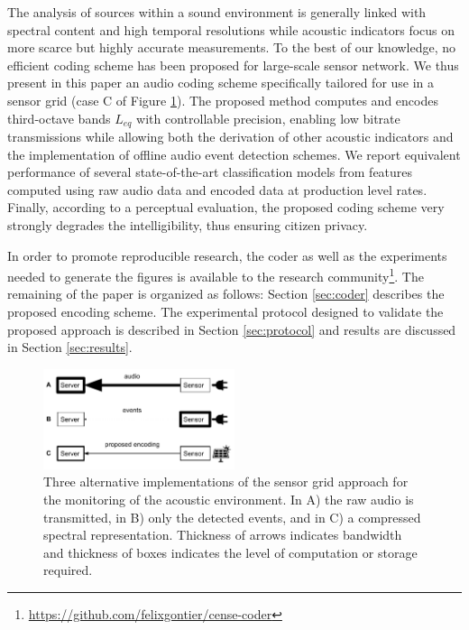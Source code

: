 \documentclass[sensors,article,submit,moreauthors,pdftex,10pt,a4paper]{mdpi}
\begin{document}
The analysis of sources within a sound environment is generally linked with spectral content \cite{ishiyama2000} and high temporal resolutions while acoustic indicators focus on more scarce but highly accurate measurements. To the best of our knowledge, no efficient coding scheme has been proposed for large-scale sensor network. We thus present in this paper an audio coding scheme specifically tailored for use in a sensor grid (case C of Figure \ref{fig:codingScheme}). The proposed method computes and encodes third-octave bands $L_{eq}$ with controllable precision, enabling low bitrate transmissions while allowing both the derivation of other acoustic indicators and the implementation of offline audio event detection schemes. We report equivalent performance of several state-of-the-art classification models from features computed using raw audio data and encoded data at production level rates. Finally, according to a perceptual evaluation, the proposed coding scheme very strongly degrades the intelligibility, thus ensuring citizen privacy.

In order to promote reproducible research, the coder as well as the experiments needed to generate the figures is available to the research community\footnote{\url{https://github.com/felixgontier/cense-coder}}. The remaining of the paper is organized as follows: Section \ref{sec:coder} describes the proposed encoding scheme. The experimental protocol designed to validate the proposed approach is described in Section \ref{sec:protocol} and results are discussed in Section \ref{sec:results}.

\begin{figure}[h]
\centering
\includegraphics[width=0.5\textwidth]{figures/censeCoder}
\caption{Three alternative implementations of the sensor grid approach for the monitoring of the acoustic environment. In A) the raw audio is transmitted, in B) only the detected events, and in C) a compressed spectral representation. Thickness of arrows indicates bandwidth and thickness of boxes indicates the level of computation or storage required.}
\label{fig:codingScheme}
\end{figure}
\end{document}
